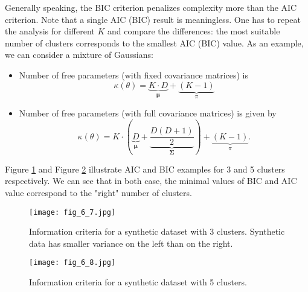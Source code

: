 \documentclass[../book-template.tex]{subfiles}
\begin{document}
Generally speaking, the BIC criterion penalizes complexity more than the AIC criterion. Note that a single AIC (BIC) result is meaningless. One has to repeat the analysis for different $K$ and compare the differences: the most suitable number of clusters corresponds to the smallest AIC (BIC) value. As an example, we can consider a mixture of Gaussians:
\begin{itemize}
	\item Number of free parameters (with fixed covariance matrices) is
	\begin{equation*}
		\kappa(\theta)=\underbrace{K\cdot D}_{\bm{\mu}}+\underbrace{(K-1)}_{\pi}
	\end{equation*}
	\item Number of free parameters (with full covariance matrices) is given by
	\begin{equation*}
	\kappa(\theta)=K\cdot\left(\underbrace{D}_{\bm{\mu}} +\underbrace{\frac{D(D+1)}{2}}_{\bm{\Sigma}} \right)+\underbrace{(K-1)}_{\pi}.
	\end{equation*}
\end{itemize}
Figure \ref{fig_6_7} and Figure \ref{fig_6_8} illustrate AIC and BIC examples for 3 and 5 clusters respectively. We can see that in both case, the minimal values of BIC and AIC value correspond to the "right" number of clusters.
\begin{figure}[h] 
	\centering 
	\texttt{[image: fig\_6\_7.jpg]} 
	\caption{Information criteria for a synthetic dataset with 3 clusters. Synthetic data has smaller variance on the left than on the right.}\label{fig_6_7}
\end{figure}
\begin{figure}[h] 
	\centering 
	\texttt{[image: fig\_6\_8.jpg]} 
	\caption{Information criteria for a synthetic dataset with 5 clusters.}\label{fig_6_8}
\end{figure}
\end{document}
